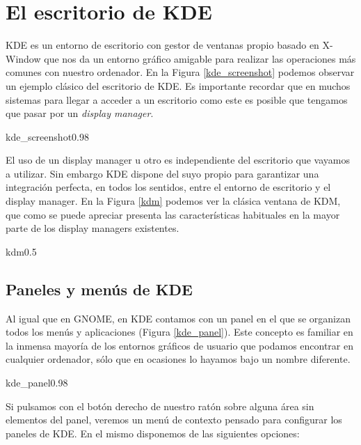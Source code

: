 \section{El escritorio de KDE}

{\sf KDE}  es un entorno de  escritorio con gestor de  ventanas propio
basado en {\sf  X-Window} que nos da un entorno  gráfico amigable para
realizar  las operaciones  más comunes  con nuestro  ordenador. En  la
Figura \ref{kde_screenshot}  podemos observar  un ejemplo  clásico del
escritorio de {\sf KDE}. Es importante recordar que en muchos sistemas
para  llegar a  acceder  a  un escritorio  como  este  es posible  que
tengamos que pasar por un {\em display manager}.

\begin{figura}{kde_screenshot}{0.98}
\caption{Aspecto del escritorio de KDE}
\label{kde_screenshot}
\end{figura}

El uso  de un display manager  u otro es independiente  del escritorio
que vayamos a utilizar. Sin embargo  {\sf KDE} dispone del suyo propio
para garantizar una integración perfecta, en todos los sentidos, entre
el entorno de escritorio y el  display manager. En la Figura \ref{kdm}
podemos  ver la  clásica  ventana  de {\sf  KDM},  que  como se  puede
apreciar presenta las características habituales  en la mayor parte de
los display managers existentes.

\begin{figura}{kdm}{0.5}
\caption{Ventana de autentificación de KDM}\label{kdm}
\end{figura}

\subsection{Paneles y menús de KDE}

Al  igual que  en {\sf  GNOME},  en {\sf  KDE} contamos  con un  panel
en  el  que  se  organizan  todos los  menús  y  aplicaciones  (Figura
\ref{kde_panel}). Este concepto  es familiar en la  inmensa mayoría de
los entornos  gráficos de usuario  que podamos encontrar  en cualquier
ordenador, sólo que en ocasiones lo hayamos bajo un nombre diferente.

\begin{figura}{kde_panel}{0.98}
\caption{Panel principal de {\sf KDE}}
\label{kde_panel}
\end{figura}

Si pulsamos  con el botón derecho  de nuestro ratón sobre  alguna área
sin  elementos del  panel, veremos  un menú  de contexto  pensado para
configurar los  paneles de {\sf  KDE}. En  el mismo disponemos  de las
siguientes opciones:

